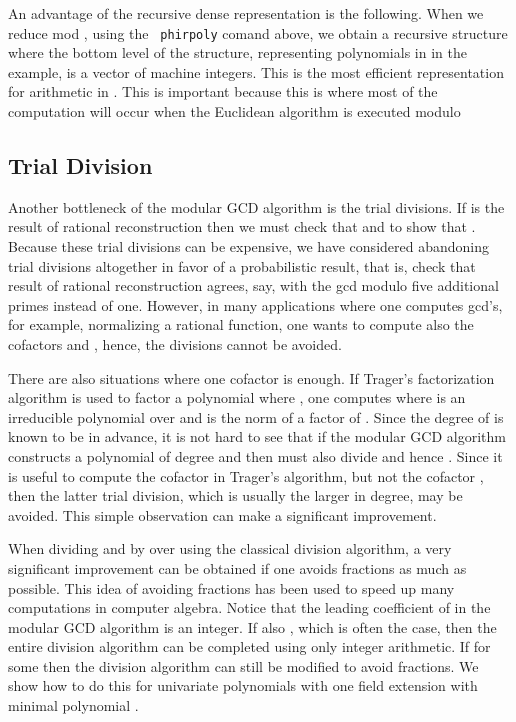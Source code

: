 \documentclass[10pt]{article}
\begin{document}
\medskip
\noindent An advantage of the recursive dense representation
is the following.  When we reduce mod , using the {\tt
phirpoly} comand above, we obtain a recursive structure where the
bottom level of the structure, representing polynomials in
 in the example, is a vector of machine integers.
This is the most efficient representation for arithmetic in .
This is important because this is where most of the computation will
occur when the Euclidean algorithm is executed modulo 
 \subsection{Trial Division}
Another bottleneck of the modular GCD algorithm is the trial divisions.
If  is the result of rational reconstruction then we must check
that  and  to show that .
Because these trial divisions can be expensive,
we have considered abandoning trial divisions altogether in favor of a
probabilistic result, that is, check that result of rational reconstruction
agrees, say, with the gcd modulo five additional primes instead of one.
However, in many applications where one computes gcd's, for example,
normalizing a rational function, one wants to compute
also the cofactors  and , hence,
the divisions cannot be avoided.

There are also situations where one cofactor is enough. If Trager's
factorization algorithm is used to factor a polynomial 
where , one computes  where  is
an irreducible polynomial over  and  is the norm of a
factor of . Since the degree of  is known to be  in advance, it is not hard to see that if the modular GCD
algorithm constructs a polynomial  of degree  and  then
 must also divide  and hence .
Since it is useful to compute the cofactor  in Trager's
algorithm, but not the cofactor , then the latter trial
division, which is usually the larger in degree, may be avoided.
This simple observation can make a significant improvement.

When dividing  and  by  over  using the classical
division algorithm, a very significant improvement can be obtained
if one avoids fractions as much as possible.  This idea of avoiding
fractions has been used to speed up many computations in computer
algebra. Notice that the leading coefficient of  in the
modular GCD algorithm is an integer.  If also , which is often the case, then the entire division algorithm
can be completed using only integer arithmetic. If  for
some  then the division algorithm can still be modified to avoid
fractions. We show how to do this for univariate polynomials with
one field extension with minimal polynomial .
\\
\end{document}
